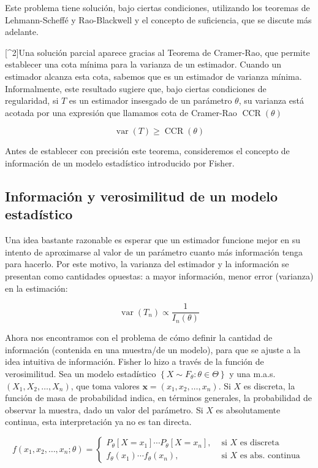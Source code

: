\documentclass[
]{article}
\begin{document}
Este problema tiene solución, bajo ciertas condiciones, utilizando los teoremas de Lehmann-Scheffé y Rao-Blackwell y el concepto de suficiencia, que se discute más adelante.

{[}\^{}2{]}Una solución parcial aparece gracias al Teorema de Cramer-Rao, que permite establecer una cota mínima para la varianza de un estimador. Cuando un estimador alcanza esta cota, sabemos que es un estimador de varianza mínima.
Informalmente, este resultado sugiere que, bajo ciertas condiciones de regularidad, si \(T\) es un estimador insesgado de un parámetro \(\theta\), su varianza está acotada por una expresión que llamamos cota de Cramer-Rao \(\operatorname{CCR}(\theta)\)

\[
\operatorname{var}(T) \geq \operatorname{CCR}(\theta)
\]

Antes de establecer con precisión este teorema, consideremos el concepto de información de un modelo estadístico introducido por Fisher.

\subsection{Información y verosimilitud de un modelo estadístico}\label{informaciuxf3n-y-verosimilitud-de-un-modelo-estaduxedstico}

Una idea bastante razonable es esperar que un estimador funcione mejor en su intento de aproximarse al valor de un parámetro cuanto más información tenga para hacerlo. Por este motivo, la varianza del estimador y la información se presentan como cantidades opuestas: a mayor información, menor error (varianza) en la estimación:

\[
\operatorname{var}\left(T_{n}\right) \propto \frac{1}{I_{n}(\theta)}
\]

Ahora nos encontramos con el problema de cómo definir la cantidad de información (contenida en una muestra/de un modelo), para que se ajuste a la idea intuitiva de información. Fisher lo hizo a través de la función de verosimilitud.
Sea un modelo estadístico \(\left\{X \sim F_{\theta}: \theta \in \Theta\right\}\) y una m.a.s. \(\left(X_{1}, X_{2}, \ldots, X_{n}\right)\), que toma valores \(\mathbf{x}=\left(x_{1}, x_{2}, \ldots, x_{n}\right)\). Si \(X\) es discreta, la función de masa de probabilidad indica, en términos generales, la probabilidad de observar la muestra, dado un valor del parámetro. Si \(X\) es absolutamente continua, esta interpretación ya no es tan directa.

\[
f\left(x_{1}, x_{2}, \ldots, x_{n} ; \theta\right)= \begin{cases}P_{\theta}\left[X=x_{1}\right] \cdots P_{\theta}\left[X=x_{n}\right], & \text { si } X \text { es discreta } \\ f_{\theta}\left(x_{1}\right) \cdots f_{\theta}\left(x_{n}\right), & \text { si } X \text { es abs. continua }\end{cases}
\]
\end{document}
